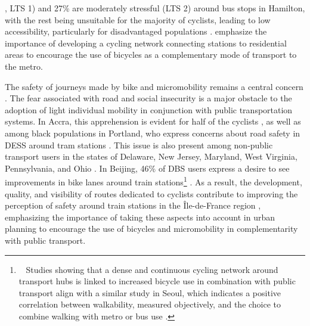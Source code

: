 \begin{refsegment}
{}, LTS 1) and 27\% are moderately stressful (LTS 2) around bus stops in Hamilton, with the rest being unsuitable for the majority of cyclists, leading to low accessibility, particularly for disadvantaged populations \textcolor{blue}{\autocite[13]{zuo_promote_2020}}. \textcolor{blue}{\textcite[50-51]{meng_influence_2016}} emphasize the importance of developing a cycling network connecting stations to residential areas to encourage the use of bicycles as a complementary mode of transport to the metro.%

The safety of journeys made by bike and micromobility remains a central concern \textcolor{blue}{\autocite[3]{yang_empirical_2016}}. The fear associated with road and social insecurity is a major obstacle to the adoption of light individual mobility in conjunction with public transportation systems. In Accra, this apprehension is evident for half of the cyclists \textcolor{blue}{\autocite[112]{quarshie_integrating_2007}}, as well as among black populations in Portland, who express concerns about road safety in \acrshort{DESS} around tram stations \textcolor{blue}{\autocite[414]{mcqueen_assessing_2022}}. This issue is also present among non-public transport users in the states of Delaware, New Jersey, Maryland, West Virginia, Pennsylvania, and Ohio \textcolor{blue}{\autocite[4962]{bopp_examining_2015}}. In Beijing, 46\% of \acrshort{DBS} users express a desire to see improvements in bike lanes around train stations\footnote{~
    Studies showing that a dense and continuous cycling network around transport hubs is linked to increased bicycle use in combination with public transport align with a similar study in Seoul, which indicates a positive correlation between \gls{walkability}, measured objectively, and the choice to combine walking with metro or bus use \textcolor{blue}{\autocite[9]{kim_does_2020}}.
} \textcolor{blue}{\autocite[13]{fan_how_2019}}. As a result, the development, quality, and visibility of routes dedicated to cyclists contribute to improving the perception of safety around train stations in the Île-de-France region \textcolor{blue}{\autocite[85]{stransky_quartiers_2017}}, emphasizing the importance of taking these aspects into account in urban planning to encourage the use of bicycles and micromobility in complementarity with public transport.%


\end{refsegment}
